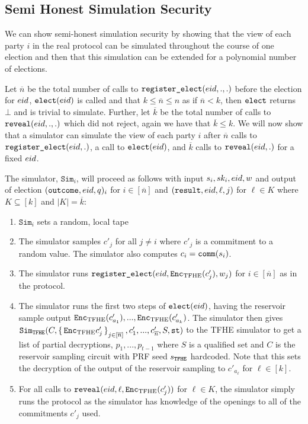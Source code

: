 \subsection{Semi Honest Simulation Security}


We can show semi-honest simulation security by showing that the view of each party $i$ in the real protocol
can be simulated throughout the course of one election and then that this simulation can be extended for a polynomial number of elections.

\newcommand{\totalReg}{\overline{n}}
\newcommand{\totalRev}{\overline{k}}
Let $\totalReg$ be the total number of calls to $\texttt{register\_elect}({eid}, ., .)$ before the election for ${eid}$, $\texttt{elect}({eid})$
is called and that $k \leq \totalReg \leq n$ as if $\totalReg < k$, then $\texttt{elect}$ returns $\bot$ and is trivial to simulate.
Further, let $\totalRev$ be the total number of calls to $\texttt{reveal}({eid}, ., .)$ which did not reject, again we have that $\totalRev \leq k$.
We will now show that a simulator can simulate the view of each party $i$ after $\totalReg$ calls to $\texttt{register\_elect}({eid}, .)$, a call to $\texttt{elect}({eid})$, and $\totalRev$ calls to $\texttt{reveal}({eid}, .)$
for a fixed ${eid}$.

\newcommand{\simIMSLE}{\texttt{Sim}_i}
The simulator, $\simIMSLE$, will proceed as follows with input $s_i, sk_i, {eid}, w$ and output of election
$(\texttt{outcome}, {eid}, q)_i$ for $i \in [\totalReg]$ and $(\texttt{result}, {eid}, \ell, j)$ for $\ell \in K$
where $K \subseteq [k]$ and $|K| = \totalRev$:

\begin{enumerate}
	\item $\simIMSLE$ sets a random, local tape
	\item The simulator samples $c'_j$ for all $j \neq i$ where $c'_j$ is a commitment to a random value.
				The simulator also computes $c_i = \texttt{comm}(s_i)$.
	\item The simulator runs $\texttt{register\_elect}({eid}, \texttt{Enc}_{\mathrm{TFHE}}(c'_j), w_j)$ for $i \in [\totalReg]$ as in the protocol.
	\item The simulator runs the first two steps of $\texttt{elect}({eid})$, having the reservoir sample output $\texttt{Enc}_{\mathrm{TFHE}}(c'_{a_1}), ..., \texttt{Enc}_{\mathrm{TFHE}}(c'_{a_k})$.
	The simulator then gives $\simTFHE(C, \set{\Enc{c'_j}}_{j \in [\totalReg]}, c'_1, ..., c'_{\totalReg}, S, \texttt{st})$
	to the TFHE simulator to get a list of partial decryptions, $p_1, ..., p_{t - 1}$ where $S$ is a qualified set %
	and $C$ is the reservoir sampling circuit with PRF seed $s_{\texttt{TFHE}}$ hardcoded.
	Note that this sets the decryption of the output of the reservoir sampling to $c'_{a_\ell}$ for $\ell \in [k]$.
	\item For all calls to $\texttt{reveal}({eid}, \ell, \texttt{Enc}_{\mathrm{TFHE}}(c'_j))$ for $\ell \in K$, the simulator 
	simply runs the protocol as the simulator has knowledge of the openings to all of the commitments $c'_j$ used.
\end{enumerate}

